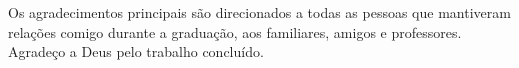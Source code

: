 Os agradecimentos principais são direcionados a todas as pessoas que mantiveram relações comigo durante a graduação, aos familiares, amigos e professores. Agradeço a Deus pelo trabalho concluído.
